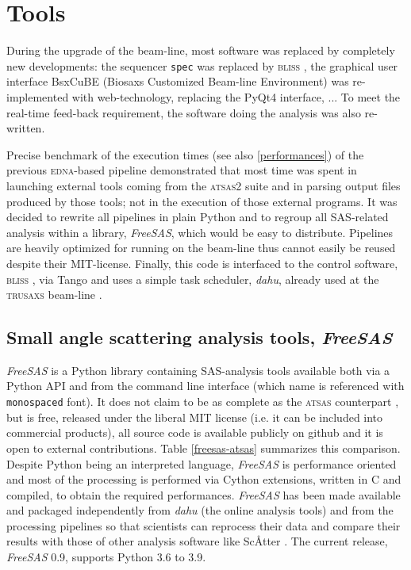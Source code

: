 \documentclass[preprint]{iucr}              %
\begin{document}
\section{Tools}
During the upgrade of the beam-line, most software was replaced by completely new developments: the sequencer \texttt{spec} \cite{spec} was replaced by \textsc{bliss} \cite{bliss}, the graphical user interface BsxCuBE (Biosaxs Customized Beam-line Environment) was re-implemented with web-technology, replacing the PyQt4 interface, ...
To meet the real-time feed-back requirement, the software doing the analysis was also re-written.

Precise benchmark of the execution times (see also \ref{performances}) of the previous \textsc{edna}-based pipeline \cite{BM29ODA} demonstrated that most time was spent in launching external tools coming from the \textsc{atsas2} suite and in parsing output files produced by those tools; not in the execution of those external programs.
It was decided to rewrite all pipelines in plain Python \cite{python} and to regroup all SAS-related analysis within a library, \textit{FreeSAS}, which would be easy to distribute. 
Pipelines \cite{dahu-bm29} are heavily optimized for running on the beam-line thus cannot easily be reused despite their MIT-license.
Finally, this code is interfaced to the control software, \textsc{bliss} \cite{bliss}, via Tango \cite{tango} and uses a simple task scheduler, \textit{dahu}, already used at the \textsc{trusaxs} beam-line \cite{id02_2022}.

\subsection{Small angle scattering analysis tools, \textit{FreeSAS}}

\textit{FreeSAS} is a Python library \cite{python} containing SAS-analysis tools available both via a Python API and from the command line interface (which name is referenced  with \texttt{monospaced} font). 
It does not claim to be as complete as the \textsc{atsas} counterpart \cite{ATSAS3},
but is free, released under the liberal MIT license (i.e. it can be included into commercial products), all source code is available publicly on github \cite{freesas} and it is open to external contributions.
Table \ref{freesas-atsas} summarizes this comparison.
Despite Python being an interpreted language, \textit{FreeSAS} is performance oriented and most of the processing is performed via Cython \cite{cython} extensions, written in C and compiled, to obtain the required performances. 
\textit{FreeSAS} has been made available and packaged independently from \textit{dahu} (the online analysis tools) and from the processing pipelines so that scientists can reprocess their data and compare their results with those of other analysis software like Sc\AA tter \cite{scatter}. 
The current release, \textit{FreeSAS} 0.9, supports Python 3.6 to 3.9.
\end{document}
